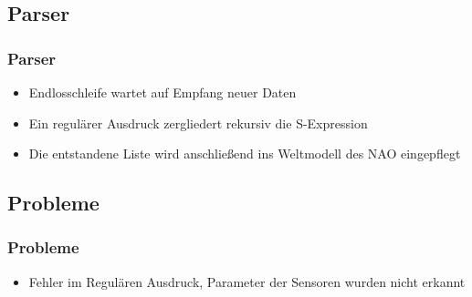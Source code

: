 \subsection{Parser}
\frame
{
  \frametitle{Parser}
  
  \begin{itemize}[<+->]
    \item Endlosschleife wartet auf Empfang neuer Daten
    \item Ein regul\"arer Ausdruck zergliedert rekursiv die S-Expression\\
    
    \item Die entstandene Liste wird anschlie{\ss}end ins Weltmodell des NAO eingepflegt
  \end{itemize}
}

\subsection{Probleme}
\frame
{
  \frametitle{Probleme}
  
  \begin{itemize}
    \item Fehler im Regul\"aren Ausdruck, Parameter der Sensoren wurden nicht erkannt
  \end{itemize}
}
